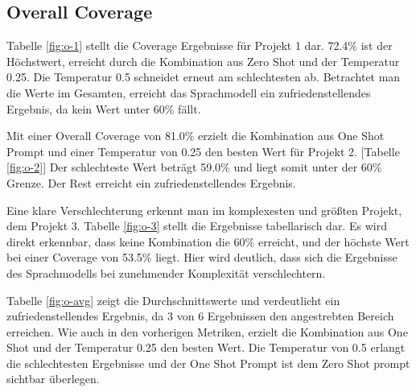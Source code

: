 \subsection{Overall Coverage}
Tabelle \ref{fig:o-1} stellt die Coverage Ergebnisse für Projekt 1 dar. 72.4\% ist der Höchstwert, erreicht durch die Kombination aus Zero Shot und der Temperatur 0.25. Die Temperatur 0.5 schneidet erneut am schlechtesten ab. Betrachtet man die Werte im Gesamten, erreicht das Sprachmodell ein zufriedenstellendes Ergebnis, da kein Wert unter 60\% fällt.

Mit einer Overall Coverage von 81.0\% erzielt die Kombination aus One Shot Prompt und einer Temperatur von 0.25 den besten Wert für Projekt 2. [Tabelle \ref{fig:o-2}] Der schlechteste Wert beträgt 59.0\% und liegt somit unter der 60\% Grenze. Der Rest erreicht ein zufriedenstellendes Ergebnis.

Eine klare Verschlechterung erkennt man im komplexesten und größten Projekt, dem Projekt 3. Tabelle \ref{fig:o-3} stellt die Ergebnisse tabellarisch dar. Es wird direkt erkennbar, dass keine Kombination die 60\% erreicht, und der höchste Wert bei einer Coverage von 53.5\% liegt. Hier wird deutlich, dass sich die Ergebnisse des Sprachmodells bei zunehmender Komplexität verschlechtern.

Tabelle \ref{fig:o-avg} zeigt die Durchschnittswerte und verdeutlicht ein zufriedenstellendes Ergebnis, da 3 von 6 Ergebnissen den angestrebten Bereich erreichen. Wie auch in den vorherigen Metriken, erzielt die Kombination aus One Shot und der Temperatur 0.25 den besten Wert. Die Temperatur von 0.5 erlangt die schlechtesten Ergebnisse und der One Shot Prompt ist dem Zero Shot prompt sichtbar überlegen.


